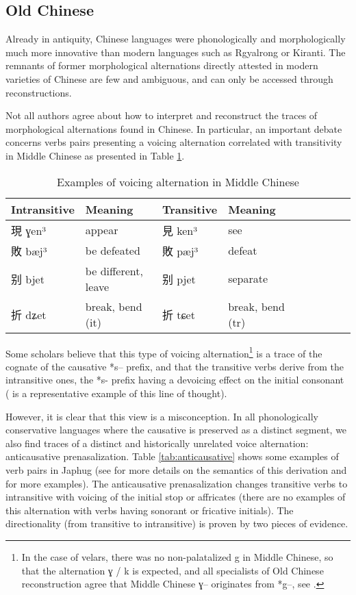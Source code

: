 \documentclass[oldfontcommands,oneside,a4paper,11pt]{article}
\newcommand{\ipa}[1]{{\phon \mbox{#1}}} %
\newcommand{\zh}[1]{{\cn #1}}
\begin{document}
\subsection{Old Chinese}
Already in antiquity, Chinese languages were phonologically and morphologically much more innovative than modern languages such as Rgyalrong or Kiranti. The remnants of former morphological alternations directly attested in modern varieties of Chinese are few and ambiguous, and can only be accessed through reconstructions. 

Not all authors agree about how to interpret and reconstruct the traces of morphological alternations found in Chinese. In particular, an important debate concerns verbs pairs presenting a voicing alternation correlated with transitivity in Middle Chinese as presented in Table \ref{tab:mc.voicing}.

\begin{table}[h]
\caption{Examples of voicing alternation in Middle Chinese}\label{tab:mc.voicing} \centering
\begin{tabular}{lllllllll} \toprule
Intransitive &Meaning & Transitive&Meaning \\
\midrule
 \zh{現} \ipa{ɣen³}  & appear &  \zh{見} \ipa{ken³}  & see \\
 \zh{敗} \ipa{bæj³}  & be defeated &  \zh{敗} \ipa{pæj³}  & defeat \\
  \zh{别} \ipa{bjet}  & be different, leave &  \zh{别} \ipa{pjet}  & separate \\
    \zh{折} \ipa{dʑet}  & break, bend (it) &  \zh{折} \ipa{tɕet}  & break, bend (tr) \\
\bottomrule
\end{tabular}
\end{table}
Some scholars believe that this type of voicing alternation\footnote{In the case of velars, there was no non-palatalized \ipa{g} in Middle Chinese, so that the alternation  \ipa{ɣ} / \ipa{k} is expected, and all specialists of Old Chinese reconstruction agree that Middle Chinese \ipa{ɣ}-- originates from *\ipa{g}--, see \citet{baxter92}.} is a trace of the cognate of the causative *\ipa{s--} prefix, and that the transitive verbs derive from the intransitive ones, the *\ipa{s-} prefix having a devoicing effect on the initial consonant (\citealt{mei12caus} is a representative example of this line of thought). 

However, it is clear that this view is a misconception. In all phonologically conservative languages where the causative is preserved as a distinct segment, we also find traces of a distinct and historically unrelated voice alternation: anticausative prenasalization. Table \ref{tab:anticausative} shows some examples of verb pairs in Japhug (see \citealt{jacques12demotion, jacques15spontaneous} for more details on the semantics of this derivation and for more examples). The anticausative prenasalization changes transitive verbs to intransitive with voicing of the initial stop or affricates (there are no examples of this alternation with verbs having sonorant or fricative initials). The directionality (from transitive to intransitive) is proven by two pieces of evidence.
\end{document}
